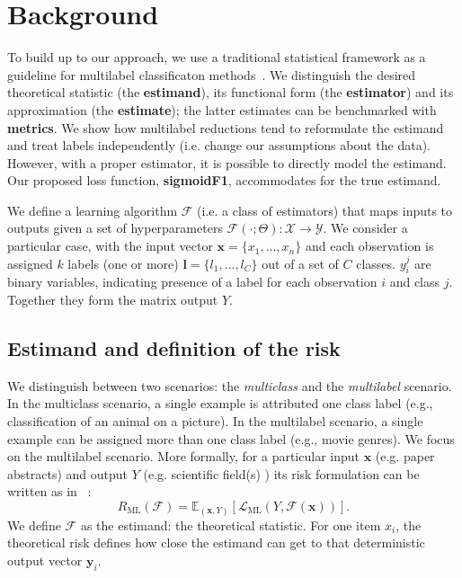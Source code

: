 
\section{Background}
\label{section:background}

To build up to our approach, we use a traditional statistical framework as a guideline for multilabel classificaton methods~\citep{tukey}. We distinguish the desired theoretical statistic (the \textbf{estimand}), its functional form (the \textbf{estimator}) and its approximation (the \textbf{estimate}); the latter estimates can be benchmarked with \textbf{metrics}. We show how multilabel reductions tend to reformulate the estimand and treat labels independently (i.e. change our assumptions about the data). However, with a proper estimator, it is possible to directly model the estimand. Our proposed loss function, \textbf{sigmoidF1}, accommodates for the true estimand.

We define a learning algorithm $\mathcal{F}$ (i.e. a class of estimators) that maps inputs to outputs given a set of hyperparameters \(\mathcal{F}(\cdot ; \Theta): \mathcal{X} \rightarrow \mathcal{Y}\). We consider a particular case, with the input vector \(\mathbf{x} = \{x_1, \ldots, x_n\}\) and each observation is assigned $k$ labels (one or more) \(\mathbf{l} = \{l_1, \ldots, l_C\}\) out of a set of $C$ classes. \(y_{i}^{j}\) are binary variables, indicating presence of a label for each observation \(i\) and class \(j\). Together they form the matrix output $Y$.

\subsection{Estimand and definition of the risk}
\label{section:background:estimand}

We distinguish between two scenarios: the \emph{multiclass} and the \emph{multilabel} scenario. 
In the multiclass scenario, a single example is attributed one class label (e.g., classification of an animal on a picture). 
In the multilabel scenario, a single example can be assigned more than one class label (e.g., movie genres). 
We focus on the multilabel scenario. More formally, for a particular input $\mathbf{x}$ (e.g. paper abstracts) and output $Y$ (e.g. scientific field(s) ) its risk formulation can be written as in ~\citep{multilabelReduction}:
%
\begin{equation}
R_{\mathrm{ML}}(\mathcal{F}) = \mathbb{E}_{(\mathbf{x}, Y)}\left[\mathcal{L}_{\mathrm{ML}}(Y, \mathcal{F}(\mathbf{x}))\right].
\end{equation}
%
We define $\mathcal{F}$ as the estimand: the theoretical statistic. For one item $x_i$, the theoretical risk defines how close the estimand can get to that deterministic output vector $\mathbf{y}_{i}$.

